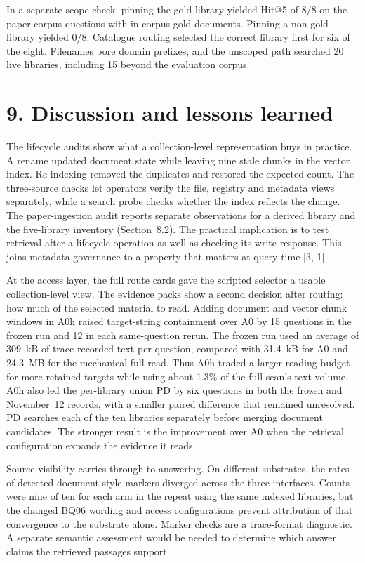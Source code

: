 In a separate scope check, pinning the gold library yielded Hit@5 of
8/8 on the paper-corpus questions with in-corpus gold documents. Pinning a
non-gold library yielded 0/8. Catalogue routing selected the correct
library first for six of the eight. Filenames bore domain prefixes,
and the unscoped path searched 20 live libraries, including 15 beyond
the evaluation corpus.


\section{9. Discussion and lessons learned}


The lifecycle audits show what a collection-level representation buys in
practice. A rename updated document state while leaving nine stale chunks
in the vector index. Re-indexing removed the duplicates and restored the
expected count. The three-source checks let operators verify the file,
registry and metadata views separately, while a search probe checks whether
the index reflects the change. The paper-ingestion audit reports separate
observations for a derived library and the five-library inventory
(Section~8.2). The practical implication is to
test retrieval after a lifecycle operation as well as checking its write
response. This joins metadata governance to a property that matters at
query time [3, 1].

At the access layer, the full route cards gave the scripted selector a
usable collection-level view. The evidence packs show a second decision
after routing: how much of the selected material to read. Adding document
and vector chunk windows in A0h raised target-string containment over A0 by
15 questions in the frozen run and 12 in each same-question rerun. The
frozen run used an average of 309~kB of trace-recorded text per question,
compared with 31.4~kB for A0 and 24.3~MB for the mechanical full read. Thus
A0h traded a larger reading budget for more retained targets while using
about 1.3\% of the full scan's text volume. A0h also led the per-library
union PD by six questions in both the frozen and November~12 records, with a smaller paired difference
that remained unresolved. PD searches each of the ten libraries separately
before merging document candidates. The stronger result is the improvement over A0
when the retrieval configuration expands the evidence it reads.

Source visibility carries through to answering. On different substrates,
the rates of detected document-style markers diverged across the three
interfaces. Counts were nine of ten for each arm in the repeat using the same
indexed libraries, but the changed BQ06 wording and access configurations
prevent attribution of that convergence to the substrate alone. Marker checks are a
trace-format diagnostic. A separate semantic assessment would be needed to
determine which answer claims the retrieved passages support.

